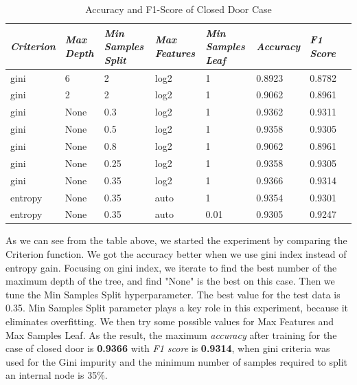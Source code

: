 \documentclass[conference]{IEEEtran}
\begin{document}
\begin{table}[H]
	\centering
	\caption{Accuracy and F1-Score of Closed Door Case}
	\label{AllArches5}
	\begin{tabular}{|p{1cm}|p{0.7cm}|p{0.7cm}|p{0.7cm}|p{1cm}|p{1cm}|p{1cm}|p{1cm}|}
	    \hline
		\textit{Criterion} 
		& \textit{Max Depth}
		& \textit{Min Samples Split}
		& \textit{Max Features}
		& \textit{Min Samples Leaf}
		& \textit{Accuracy}
		& \textit{F1 Score}\\ \hline
		gini & 6 & 2 & log2 & 1 & 0.8923 & 0.8782\\ \hline
		gini & 2 & 2 & log2 & 1 & 0.9062 & 0.8961\\ \hline
		gini & None & 0.3 & log2 & 1 & 0.9362 & 0.9311\\ \hline
		gini & None & 0.5 & log2 & 1 & 0.9358 & 0.9305\\ \hline
		gini & None & 0.8 & log2 & 1 & 0.9062 & 0.8961\\ \hline
		gini & None & 0.25 & log2 & 1 & 0.9358 & 0.9305\\ \hline
		gini & None & 0.35 & log2 & 1 & \cellcolor{green!25}0.9366 & \cellcolor{green!25}0.9314\\ \hline
		entropy & None & 0.35 & auto & 1 & 0.9354 & 0.9301\\ \hline
		entropy & None & 0.35 & auto & 0.01 & 0.9305 & 0.9247\\ \hline
	\end{tabular}
\end{table}

As we can see from the table above, we started the experiment by comparing the Criterion function. We got the accuracy better when we use gini index instead of entropy gain. Focusing on gini index, we iterate to find the best number of the maximum depth of the tree, and find "None" is the best on this case. Then we tune the Min Samples Split hyperparameter. The best value for the test data is 0.35. Min Samples Split parameter plays a key role in this experiment, because it eliminates overfitting. We then try some possible values for Max Features and Max Samples Leaf. As the result, the maximum \textit{accuracy} after training for the case of closed door is \textbf{0.9366} with \textit{F1 score} is \textbf{0.9314}, when gini criteria was used for the Gini impurity and the minimum number of samples required to split an internal node is 35\%. \\
\end{document}
